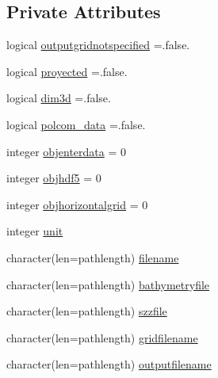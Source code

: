 \subsection*{Private Attributes}
\begin{DoxyCompactItemize}
\item 
logical \mbox{\hyperlink{structmodulecfpolcomformat_1_1t__cfpolcomformat_a8b381ba0c8c9c167b2862a65f5da07f9}{outputgridnotspecified}} =.false.
\item 
logical \mbox{\hyperlink{structmodulecfpolcomformat_1_1t__cfpolcomformat_a18a99366aecc56a67cc077c7edae9b4b}{proyected}} =.false.
\item 
logical \mbox{\hyperlink{structmodulecfpolcomformat_1_1t__cfpolcomformat_aa470dc78fb7e822e0c287c39f212ccfd}{dim3d}} =.false.
\item 
logical \mbox{\hyperlink{structmodulecfpolcomformat_1_1t__cfpolcomformat_ad115025c6e10ea66b859aa539bb4b9e3}{polcom\+\_\+data}} =.false.
\item 
integer \mbox{\hyperlink{structmodulecfpolcomformat_1_1t__cfpolcomformat_a3346ed16289e651f3c7b1b1cb12727d5}{objenterdata}} = 0
\item 
integer \mbox{\hyperlink{structmodulecfpolcomformat_1_1t__cfpolcomformat_a3ed65414be75efe9af8412fbb937309c}{objhdf5}} = 0
\item 
integer \mbox{\hyperlink{structmodulecfpolcomformat_1_1t__cfpolcomformat_ae3b28354c8b73f464f24c97a15ee78e2}{objhorizontalgrid}} = 0
\item 
integer \mbox{\hyperlink{structmodulecfpolcomformat_1_1t__cfpolcomformat_a269eff2f3d398df3053846b4d9c497c3}{unit}}
\item 
character(len=pathlength) \mbox{\hyperlink{structmodulecfpolcomformat_1_1t__cfpolcomformat_af441fb9cb18963a61762944f0c6a4961}{filename}}
\item 
character(len=pathlength) \mbox{\hyperlink{structmodulecfpolcomformat_1_1t__cfpolcomformat_aa60b995c6f1e1fa857e70b7162e54c7b}{bathymetryfile}}
\item 
character(len=pathlength) \mbox{\hyperlink{structmodulecfpolcomformat_1_1t__cfpolcomformat_ace47976b38bfc2c3d6d3387cee004e11}{szzfile}}
\item 
character(len=pathlength) \mbox{\hyperlink{structmodulecfpolcomformat_1_1t__cfpolcomformat_acc38e2fc67778750a0fe2c76c20f1679}{gridfilename}}
\item 
character(len=pathlength) \mbox{\hyperlink{structmodulecfpolcomformat_1_1t__cfpolcomformat_aad82cc915dd74f12bc1fd532a68e2969}{outputfilename}}
\item 

\end{DoxyCompactItemize}
